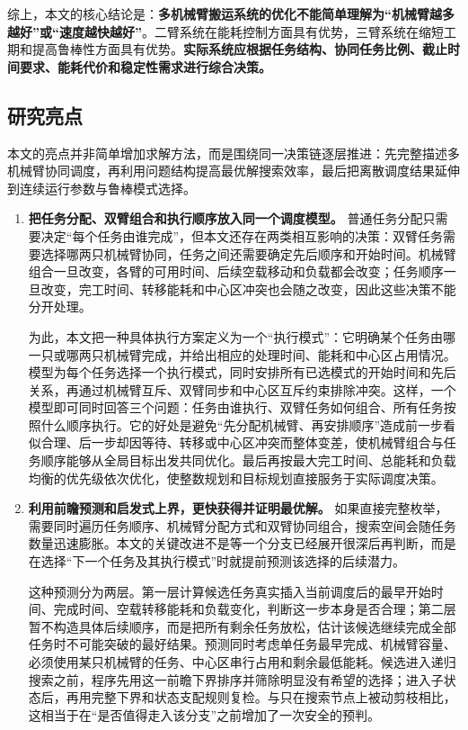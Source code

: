 综上，本文的核心结论是：\textbf{多机械臂搬运系统的优化不能简单理解为“机械臂越多越好”或“速度越快越好”}。二臂系统在能耗控制方面具有优势，三臂系统在缩短工期和提高鲁棒性方面具有优势。\textbf{实际系统应根据任务结构、协同任务比例、截止时间要求、能耗代价和稳定性需求进行综合决策。}


\subsection{研究亮点}

本文的亮点并非简单增加求解方法，而是围绕同一决策链逐层推进：先完整描述多机械臂协同调度，再利用问题结构提高最优解搜索效率，最后把离散调度结果延伸到连续运行参数与鲁棒模式选择。

\begin{enumerate}
	\item \textbf{把任务分配、双臂组合和执行顺序放入同一个调度模型。}
普通任务分配只需要决定“每个任务由谁完成”，但本文还存在两类相互影响的决策：双臂任务需要选择哪两只机械臂协同，任务之间还需要确定先后顺序和开始时间。机械臂组合一旦改变，各臂的可用时间、后续空载移动和负载都会改变；任务顺序一旦改变，完工时间、转移能耗和中心区冲突也会随之改变，因此这些决策不能分开处理。

为此，本文把一种具体执行方案定义为一个“执行模式”：它明确某个任务由哪一只或哪两只机械臂完成，并给出相应的处理时间、能耗和中心区占用情况。模型为每个任务选择一个执行模式，同时安排所有已选模式的开始时间和先后关系，再通过机械臂互斥、双臂同步和中心区互斥约束排除冲突。这样，一个模型即可同时回答三个问题：任务由谁执行、双臂任务如何组合、所有任务按照什么顺序执行。它的好处是避免“先分配机械臂、再安排顺序”造成前一步看似合理、后一步却因等待、转移或中心区冲突而整体变差，使机械臂组合与任务顺序能够从全局目标出发共同优化。最后再按最大完工时间、总能耗和负载均衡的优先级依次优化，使整数规划和目标规划直接服务于实际调度决策。

	\item \textbf{利用前瞻预测和启发式上界，更快获得并证明最优解。}
如果直接完整枚举，需要同时遍历任务顺序、机械臂分配方式和双臂协同组合，搜索空间会随任务数量迅速膨胀。本文的关键改进不是等一个分支已经展开很深后再判断，而是在选择“下一个任务及其执行模式”时就提前预测该选择的后续潜力。

这种预测分为两层。第一层计算候选任务真实插入当前调度后的最早开始时间、完成时间、空载转移能耗和负载变化，判断这一步本身是否合理；第二层暂不构造具体后续顺序，而是把所有剩余任务放松，估计该候选继续完成全部任务时不可能突破的最好结果。预测同时考虑单任务最早完成、机械臂容量、必须使用某只机械臂的任务、中心区串行占用和剩余最低能耗。候选进入递归搜索之前，程序先用这一前瞻下界排序并筛除明显没有希望的选择；进入子状态后，再用完整下界和状态支配规则复检。与只在搜索节点上被动剪枝相比，这相当于在“是否值得走入该分支”之前增加了一次安全的预判。


\end{enumerate}
